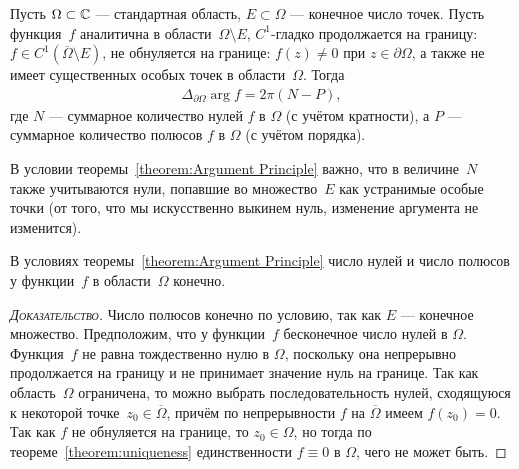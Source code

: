 \documentclass[../complex-analysis.tex]{subfiles}
\begin{document}
\begin{thm}
 \label{theorem:Argument Principle}
 Пусть $ \Omega \subset\mathbb{C}$ --- стандартная область, $ E \subset \Omega $ --- конечное число точек. Пусть функция~$ f $ аналитична в области~$ \Omega \setminus E $, $ C^{1} $-гладко продолжается на границу: $ f \in C^{1}(\overline\Omega \setminus E) $, не обнуляется на границе: $ f(z) \neq 0 $ при $ z \in \partial\Omega $, а также не имеет существенных особых точек в области~$ \Omega $. Тогда
 \begin{align*}
  \Delta_{\partial \Omega} \arg f = 2\pi(N - P),
 \end{align*} где $ N $ --- суммарное количество нулей $ f $ в $ \Omega $ (с учётом кратности), а $ P $ --- суммарное количество  полюсов $ f $ в $ \Omega $ (с учётом порядка).
\end{thm}

В условии теоремы~\ref{theorem:Argument Principle} важно, что в величине~$ N $ также учитываются нули, попавшие во множество~$ E $ как устранимые особые точки (от того, что мы искусственно выкинем нуль, изменение аргумента не изменится).

\begin{remrk}
 В условиях теоремы~\ref{theorem:Argument Principle} число нулей и число полюсов у функции~$ f $ в области~$ \Omega $ конечно.
\end{remrk}
\begin{proof}[\normalfont\textsc{Доказательство}]
 Число полюсов конечно по условию, так как $ E $ --- конечное множество. Предположим, что у функции~$ f $ бесконечное число нулей в $ \Omega $. Функция~$ f $ не равна тождественно нулю в $ \Omega $, поскольку она непрерывно продолжается на границу и не принимает значение нуль на границе. Так как область~$ \Omega $ ограничена, то можно выбрать последовательность нулей, сходящуюся к некоторой точке~$ z_0 \in \overline\Omega $, причём по непрерывности $ f $ на $ \overline\Omega $ имеем $ f(z_0) = 0 $. Так как $ f $ не обнуляется на границе, то $ z_0 \in \Omega $, но тогда по теореме~\ref{theorem:uniqueness} единственности $ f \equiv 0 $ в $ \Omega $, чего не может быть.
\end{proof}
\end{document}
